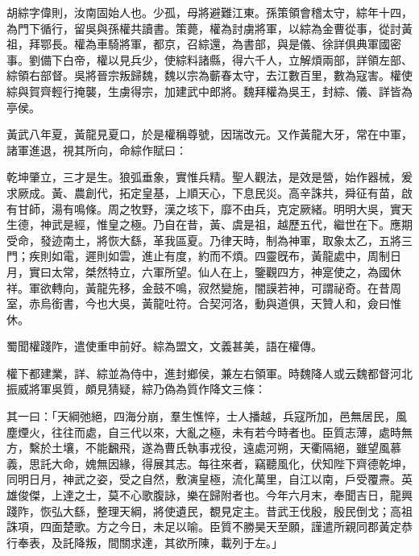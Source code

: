 
\begin{pinyinscope}
胡綜字偉則，汝南固始人也。少孤，母將避難江東。孫策領會稽太守，綜年十四，為門下循行，留吳與孫權共讀書。策薨，權為討虜將軍，以綜為金曹從事，從討黃祖，拜鄂長。權為車騎將軍，都京，召綜還，為書部，與是儀、徐詳俱典軍國密事。劉備下白帝，權以見兵少，使綜料諸縣，得六千人，立解煩兩部，詳領左部、綜領右部督。吳將晉宗叛歸魏，魏以宗為蘄春太守，去江數百里，數為寇害。權使綜與賀齊輕行掩襲，生虜得宗，加建武中郎將。魏拜權為吳王，封綜、儀、詳皆為亭侯。

黃武八年夏，黃龍見夏口，於是權稱尊號，因瑞改元。又作黃龍大牙，常在中軍，諸軍進退，視其所向，命綜作賦曰：

乾坤肇立，三才是生。狼弧垂象，實惟兵精。聖人觀法，是效是營，始作器械，爰求厥成。黃、農創代，拓定皇基，上順天心，下息民災。高辛誅共，舜征有苗，啟有甘師，湯有鳴條。周之牧野，漢之垓下，靡不由兵，克定厥緒。明明大吳，實天生德，神武是經，惟皇之極。乃自在昔，黃、虞是祖，越歷五代，繼世在下。應期受命，發迹南土，將恢大繇，革我區夏。乃律天時，制為神軍，取象太乙，五將三門；疾則如電，遲則如雲，進止有度，約而不煩。四靈旣布，黃龍處中，周制日月，實曰太常，桀然特立，六軍所望。仙人在上，鑒觀四方，神寔使之，為國休祥。軍欲轉向，黃龍先移，金鼓不鳴，寂然變施，闇謨若神，可謂祕奇。在昔周室，赤烏銜書，今也大吳，黃龍吐符。合契河洛，動與道俱，天贊人和，僉曰惟休。

蜀聞權踐阼，遣使重申前好。綜為盟文，文義甚美，語在權傳。

權下都建業，詳、綜並為侍中，進封鄉侯，兼左右領軍。時魏降人或云魏都督河北振威將軍吳質，頗見猜疑，綜乃偽為質作降文三條：

其一曰：「天綱弛絕，四海分崩，羣生憔悴，士人播越，兵寇所加，邑無居民，風塵煙火，往往而處，自三代以來，大亂之極，未有若今時者也。臣質志薄，處時無方，繫於土壤，不能飜飛，遂為曹氏執事戎役，遠處河朔，天衢隔絕，雖望風慕義，思託大命，媿無因緣，得展其志。每往來者，竊聽風化，伏知陛下齊德乾坤，同明日月，神武之姿，受之自然，敷演皇極，流化萬里，自江以南，戶受覆燾。英雄俊傑，上達之士，莫不心歌腹詠，樂在歸附者也。今年六月末，奉聞吉日，龍興踐阼，恢弘大繇，整理天綱，將使遺民，覩見定主。昔武王伐殷，殷民倒戈；高祖誅項，四面楚歌。方之今日，未足以喻。臣質不勝昊天至願，謹遣所親同郡黃定恭行奉表，及託降叛，間關求達，其欲所陳，載列于左。」


\end{pinyinscope}
